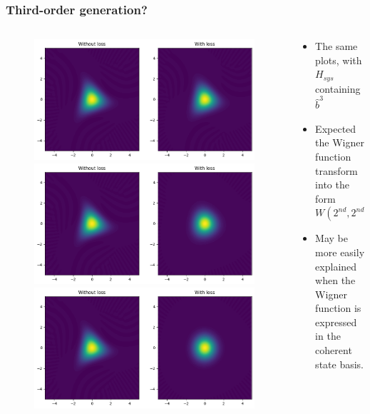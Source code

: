 \documentclass{beamer}
\begin{document}
\begin{frame}[c]
  \frametitle{Third-order generation?}
  \begin{columns}
    \begin{column}{0.5\linewidth}
      \begin{figure}
        \includegraphics[width=0.7\linewidth]{third_decay_0.2.png}
        \includegraphics[width=0.7\linewidth]{third_decay_0.5.png}
        \includegraphics[width=0.7\linewidth]{third_decay_1.0.png}
      \end{figure}
    \end{column}
    \begin{column}{0.5\linewidth}
      \begin{itemize}
        \item The same plots, with $H_{sys}$ containing $\hat{b}^{3}$
        \item Expected the Wigner function transform into the form $W(2^{nd},2^{nd})$
        \item May be more easily explained when the Wigner function is expressed in the coherent state basis.
      \end{itemize}
    \end{column}
  \end{columns}
\end{frame}
\end{document}
